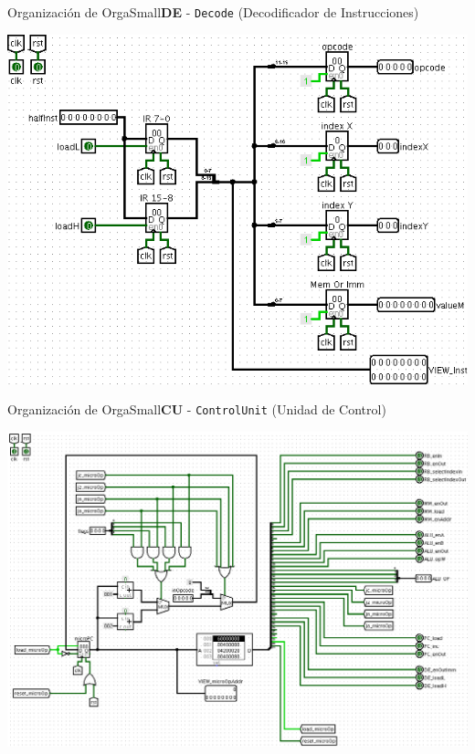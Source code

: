 \documentclass[aspectratio=169]{beamer}
\begin{document}
\begin{frame}[fragile,t]{Organización de OrgaSmall}{\textbf{DE} - \texttt{Decode} (Decodificador de Instrucciones)}
    \begin{center} \includegraphics[scale=0.3]{img/6_Decode.png} \end{center}
\end{frame}

\begin{frame}[fragile,t]{Organización de OrgaSmall}{\textbf{CU} - \texttt{ControlUnit} (Unidad de Control)}
    \begin{center} \includegraphics[scale=1.06]{img/8_ControlUnit.png} \end{center}
\end{frame}
\end{document}
